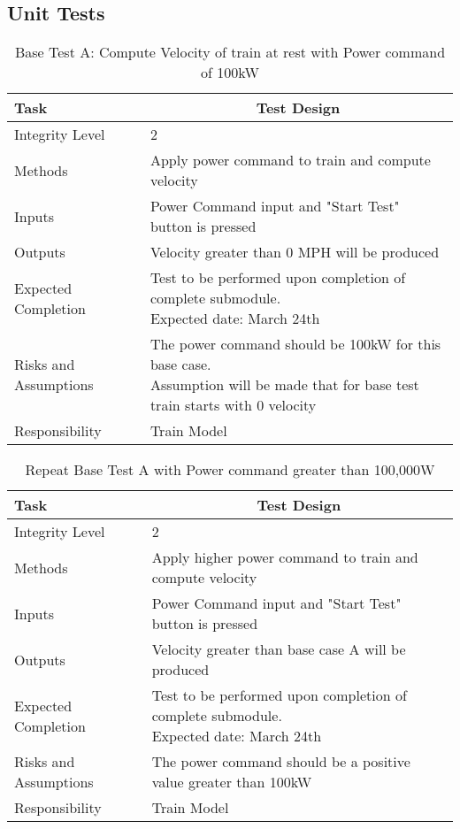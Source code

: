 \documentclass[]{article}
\begin{document}
\subsection{Unit Tests}
 
    \begin{table}[H]
        \centering
        \caption{Base Test A: Compute Velocity of train at rest with Power command of 100kW}
        \begin{tabular}{|l|l|}
            \hline
            Task & \multicolumn{1}{c|}{Test Design} \\ \hline
            Integrity Level & 2 \\ \hline
            Methods & Apply power command to train and compute velocity  \\ \hline
            Inputs &  Power Command input and "Start Test" button is pressed \\ \hline
            Outputs &  Velocity greater than 0 MPH will be produced  \\ \hline
            Expected Completion & \parbox[t]{10cm}{Test to be performed upon completion of complete submodule.\\ Expected date: March 24th}\\ \hline
            Risks and Assumptions & \parbox[t]{10cm}{The power command should be 100kW for this base case. \\ Assumption will be made that for base test train starts with 0 velocity} \\ \hline
            Responsibility & Train Model\\ \hline
        \end{tabular}
    \end{table}

	\begin{table}[H]
		\centering
		\caption{Repeat Base Test A with Power command greater than 100,000W}
		\begin{tabular}{|l|l|}
			\hline
			Task & \multicolumn{1}{c|}{Test Design} \\ \hline
			Integrity Level & 2 \\ \hline
			Methods & Apply higher power command to train and compute velocity  \\ \hline
			Inputs &  Power Command input and "Start Test" button is pressed \\ \hline
			Outputs &  Velocity greater than base case A will be produced  \\ \hline
			Expected Completion & \parbox[t]{10cm}{Test to be performed upon completion of complete submodule.\\ Expected date: March 24th}\\ \hline
			Risks and Assumptions & The power command should be a positive value greater than 100kW \\ \hline
			Responsibility & Train Model\\ \hline
		\end{tabular}
	\end{table}
    
\end{document}
